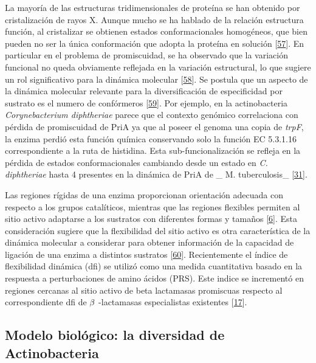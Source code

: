 \documentclass[12pt,twoside]{reedthesis}
\begin{document}
  La mayoría de las estructuras tridimensionales de proteína se han
  obtenido por cristalización de rayos X. Aunque mucho se ha hablado de la
  relación estructura función, al cristalizar se obtienen estados
  conformacionales homogéneos, que bien pueden no ser la única
  conformación que adopta la proteína en solución
  {[}\protect\hyperlink{ref-james_conformational_2003}{57}{]}. En
  particular en el problema de promiscuidad, se ha observado que la
  variación funcional no queda obviamente reflejada en la variación
  estructural, lo que sugiere un rol significativo para la dinámica
  molecular {[}\protect\hyperlink{ref-parisi_conformational_2015}{58}{]}.
  Se postula que un aspecto de la dinámica molecular relevante para la
  diversificación de especificidad por sustrato es el numero de
  confórmeros {[}\protect\hyperlink{ref-javier_zea_protein_2013}{59}{]}.
  Por ejemplo, en la actinobacteria \emph{Corynebacterium diphtheriae}
  parece que el contexto genómico correlaciona con pérdida de promiscuidad
  de PriA ya que al poseer el genoma una copia de \emph{trpF}, la enzima
  perdió esta función química conservando solo la función EC 5.3.1.16
  correspondiente a la ruta de histidina. Esta sub-funcionalización se
  refleja en la pérdida de estados conformacionales cambiando desde un
  estado en \emph{C. diphtheriae} hasta 4 presentes en la dinámica de PriA
  de \_ M. tuberculosis\_
  {[}\protect\hyperlink{ref-noda-garcia_evolution_2013}{31}{]}.
  
  Las regiones rígidas de una enzima proporcionan orientación adecuada con
  respecto a los grupos catalíticos, mientras que las regiones flexibles
  permiten al sitio activo adaptarse a los sustratos con diferentes formas
  y tamaños {[}\protect\hyperlink{ref-copley_enzymes_2003}{6}{]}. Esta
  consideración sugiere que la flexibilidad del sitio activo es otra
  característica de la dinámica molecular a considerar para obtener
  información de la capacidad de ligación de una enzima a distintos
  sustratos
  {[}\protect\hyperlink{ref-gatti-lafranconi_flexibility_2013}{60}{]}.
  Recientemente el índice de flexibilidad dinámica (dfi) se utilizó como
  una medida cuantitativa basado en la respuesta a perturbaciones de amino
  ácidos (PRS). Este indice se incrementó en regiones cercanas al sitio
  activo de beta lactamasas promiscuas respecto al correspondiente dfi de
  \(\noindent\beta\) -lactamasas especialistas existentes
  {[}\protect\hyperlink{ref-zou_evolution_2015}{17}{]}.
  
  \subsection{Modelo biológico: la diversidad de
  Actinobacteria}\label{modelo-biologico-la-diversidad-de-actinobacteria}
  
\end{document}
